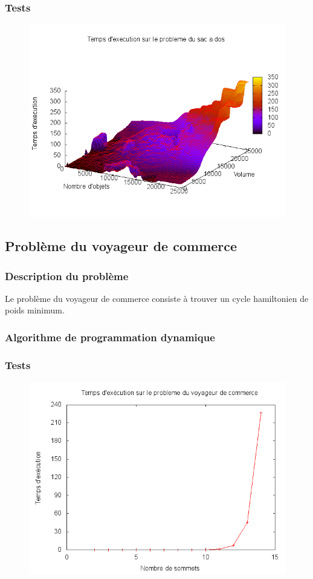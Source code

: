 \subsubsection{Tests}

\begin{figure}[H]
	\includegraphics[width=\linewidth]{../pratique/prog_dynamique_dev/res/bag.png}
\end{figure}


\subsection{Problème du voyageur de commerce}

\subsubsection{Description du problème}
Le problème du voyageur de commerce consiste à trouver un cycle hamiltonien de poids minimum.
\subsubsection{Algorithme de programmation dynamique}



\subsubsection{Tests}

\begin{figure}[H]
	\includegraphics[width=\linewidth]{../pratique/prog_dynamique_dev/res/tsp.png}
\end{figure}


